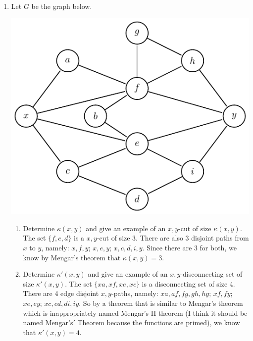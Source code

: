 \documentclass[12pt]{article}
\begin{document}
\begin{enumerate}
\item Let $G$ be the graph below.
\begin{center}
\includegraphics[scale=.9]{6_1.pdf}
\end{center}
\begin{enumerate}
\item Determine $\kappa(x,y)$ and give an example of an $x,y$-cut of size $\kappa(x,y)$.\m
The set $\{f,e,d\}$ is a $x,y$-cut of size 3. There are also 3 disjoint paths from $x$ to $y$, namely: $x,f,y$; $x,e,y$; $x,c,d,i,y$. Since there are 3 for both, we know by Mengar's theorem that $\kappa(x,y) = 3$.
\item Determine $\kappa'(x,y)$ and give an example of an $x,y$-disconnecting set of size $\kappa'(x,y)$.\m
The set $\{xa,xf,xe,xc\}$ is a disconnecting set of size 4. There are 4 edge disjoint $x,y$-paths, namely: $xa,af,fg,gh,hy$; $xf,fy$; $xe,ey$; $xc,cd,di,iy$. So by a theorem that is similar to Mengar's theorem which is inappropriately named Mengar's II theorem (I think it should be named Mengar's$'$ Theorem because the functions are primed), we know that $\kappa'(x,y) = 4$.
\end{enumerate}

\end{enumerate}
\end{document}

